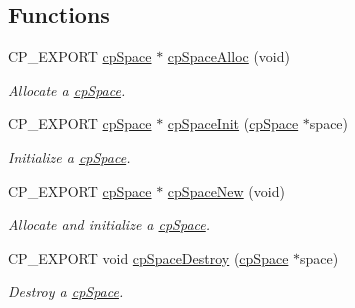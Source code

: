 \subsection*{Functions}
\begin{DoxyCompactItemize}
\item 
\mbox{\label{group__cp_space_ga5e651c82cae8cc6fe7c8997ac8f6d845}} 
C\+P\+\_\+\+E\+X\+P\+O\+RT \mbox{\hyperlink{structcp_space}{cp\+Space}} $\ast$ \mbox{\hyperlink{group__cp_space_ga5e651c82cae8cc6fe7c8997ac8f6d845}{cp\+Space\+Alloc}} (void)
\begin{DoxyCompactList}\small\item\em Allocate a \mbox{\hyperlink{structcp_space}{cp\+Space}}. \end{DoxyCompactList}\item 
\mbox{\label{group__cp_space_ga48465620bca056caf5501bed44d142d8}} 
C\+P\+\_\+\+E\+X\+P\+O\+RT \mbox{\hyperlink{structcp_space}{cp\+Space}} $\ast$ \mbox{\hyperlink{group__cp_space_ga48465620bca056caf5501bed44d142d8}{cp\+Space\+Init}} (\mbox{\hyperlink{structcp_space}{cp\+Space}} $\ast$space)
\begin{DoxyCompactList}\small\item\em Initialize a \mbox{\hyperlink{structcp_space}{cp\+Space}}. \end{DoxyCompactList}\item 
\mbox{\label{group__cp_space_gae7566474e9ba9a1fac8d3e947aaaf967}} 
C\+P\+\_\+\+E\+X\+P\+O\+RT \mbox{\hyperlink{structcp_space}{cp\+Space}} $\ast$ \mbox{\hyperlink{group__cp_space_gae7566474e9ba9a1fac8d3e947aaaf967}{cp\+Space\+New}} (void)
\begin{DoxyCompactList}\small\item\em Allocate and initialize a \mbox{\hyperlink{structcp_space}{cp\+Space}}. \end{DoxyCompactList}\item 
\mbox{\label{group__cp_space_gaaf1097ee4fb04f32c4e82271d7603d26}} 
C\+P\+\_\+\+E\+X\+P\+O\+RT void \mbox{\hyperlink{group__cp_space_gaaf1097ee4fb04f32c4e82271d7603d26}{cp\+Space\+Destroy}} (\mbox{\hyperlink{structcp_space}{cp\+Space}} $\ast$space)
\begin{DoxyCompactList}\small\item\em Destroy a \mbox{\hyperlink{structcp_space}{cp\+Space}}. \end{DoxyCompactList}\item 

\end{DoxyCompactItemize}
